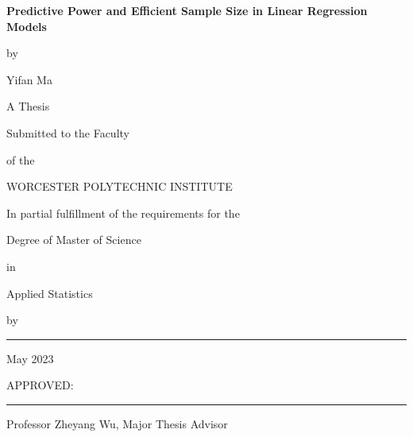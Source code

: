 \begin{titlepage}
\thispagestyle{empty}
\begin{center}
\vspace*{0.18in}

   {\large
	\textbf{
Predictive Power and Efficient Sample Size in Linear Regression Models
	}
   }

\vspace*{0.18in}
by

\vspace*{0.18in}
Yifan Ma

\vspace*{0.18in}
A Thesis

\vspace*{0.18in}
Submitted to the Faculty

\vspace*{0.18in}
of the

\vspace*{0.18in}
WORCESTER POLYTECHNIC INSTITUTE

\vspace*{0.18in}
In partial fulfillment of the requirements for the

\vspace*{0.18in}
Degree of Master of Science

\vspace*{0.18in}
in

\vspace*{0.18in}
Applied Statistics

\vspace*{0.18in}
by

\vspace*{0.18in}\vspace*{0.18in}
\rule{3in}{1.2pt}

\vspace*{0.18in}
May 2023
\end{center}


\vspace{1.75in}

APPROVED:

\vspace{0.25in}
\rule{3in}{0.8pt}

Professor Zheyang Wu, Major Thesis Advisor

\vspace{0.25in}


\end{titlepage}
